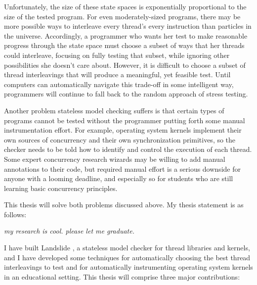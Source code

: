 \documentclass[12pt]{cmuthesis}
\begin{document}
Unfortunately, the size of these state spaces is exponentially proportional to the size of the tested program.
For even moderately-sized programs, there may be more possible ways to interleave every thread's every instruction
than particles in the universe.
Accordingly, a programmer who wants her test to make reasonable progress through the state space must choose a subset of ways that her threads could interleave,
focusing on fully testing that subset, while ignoring other possibilities she doesn't care about.
However, it is difficult to choose a subset of thread interleavings that will produce a meaningful, yet feasible test.
Until computers can automatically navigate this trade-off in some intelligent way,
programmers will continue to fall back to the random approach of stress testing.

Another problem stateless model checking suffers is that certain types of programs cannot be tested without the programmer putting forth some manual instrumentation effort.
For example, operating system kernels implement their own sources of concurrency and their own synchronization primitives,
so the checker needs to be told how to identify and control the execution of each thread.
Some expert concurrency research wizards may be willing to add manual annotations to their code,
but required manual effort is a serious downside for anyone with a looming deadline,
and especially so for students who are still learning basic concurrency principles.

This thesis will solve both problems discussed above.
My thesis statement is as follows:

\vspace{1em}

\begin{center}
	{\em my research is cool. please let me graduate.}
\end{center}

\vspace{1em}

I have built Landslide \cite{landslide}, a stateless model checker for thread libraries and kernels,
and I have developed some techniques for automatically choosing the best thread interleavings to test
and for automatically instrumenting operating system kernels in an educational setting.
This thesis will comprise three major contributions:
\end{document}
